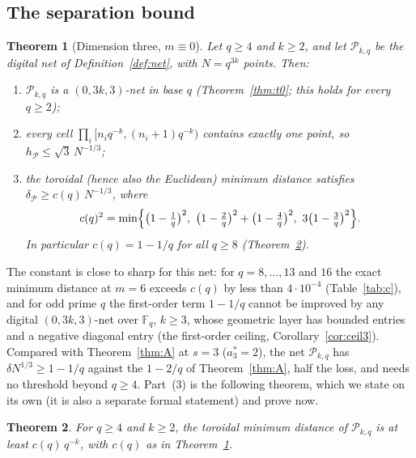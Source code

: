 \documentclass[11pt]{amsart}
\newtheorem{theorem}{Theorem}
\theoremstyle{definition}
\theoremstyle{plain}
\newcommand{\F}{\mathbb{F}}
\begin{document}
\subsection{The separation bound}
\begin{theorem}[Dimension three, $m\equiv0$]\label{thm:main}
Let $q\ge 4$ and $k\ge 2$, and let $\mathcal P_{k,q}$ be the digital net of Definition~\ref{def:net}, with $N=q^{3k}$ points. Then:
\begin{enumerate}
\item $\mathcal P_{k,q}$ is a $(0,3k,3)$-net in base $q$ (Theorem~\ref{thm:t0}; this holds for every $q\ge2$);
\item every cell $\prod_i[n_i q^{-k},(n_i+1)q^{-k})$ contains exactly one point, so $h_{\mathcal P}\le\sqrt3\,N^{-1/3}$;
\item the toroidal (hence also the Euclidean) minimum distance satisfies $\delta_{\mathcal P}\ge c(q)\,N^{-1/3}$, where
\[
c(q)^2=\min\Bigl\{\bigl(1-\tfrac1q\bigr)^2,\ \bigl(1-\tfrac2q\bigr)^2+\bigl(1-\tfrac4q\bigr)^2,\ 3\bigl(1-\tfrac3q\bigr)^2\Bigr\}.
\]
In particular $c(q)=1-1/q$ for all $q\ge8$ (Theorem~\ref{thm:sep}).
\end{enumerate}
\end{theorem}

The constant is close to sharp for this net: for $q=8,\dots,13$ and $16$ the exact minimum distance at $m=6$ exceeds $c(q)$ by less than $4\cdot10^{-4}$ (Table~\ref{tab:c}), and for odd prime $q$ the first-order term $1-1/q$ cannot be improved by any digital $(0,3k,3)$-net over $\F_q$, $k\ge3$, whose geometric layer has bounded entries and a negative diagonal entry (the first-order ceiling, Corollary~\ref{cor:ceil3}). Compared with Theorem~\ref{thm:A} at $s=3$ ($a^*_3=2$), the net $\mathcal P_{k,q}$ has $\delta N^{1/3}\ge1-1/q$ against the $1-2/q$ of Theorem~\ref{thm:A}, half the loss, and needs no threshold beyond $q\ge4$. Part~(3) is the following theorem, which we state on its own (it is also a separate formal statement) and prove now.
\begin{theorem}\label{thm:sep}
For $q\ge4$ and $k\ge2$, the toroidal minimum distance of $\mathcal P_{k,q}$ is at least $c(q)\,q^{-k}$, with $c(q)$ as in Theorem~\ref{thm:main}.
\end{theorem}
\end{document}
